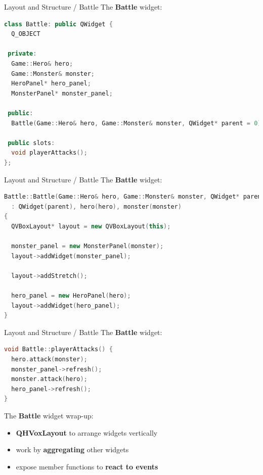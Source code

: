 \documentclass[11pt]{beamer}
\renewcommand{\emph}[1]{\textbf{#1}}
\begin{document}
\begin{frame}[fragile]{Layout and Structure / Battle}
 The \emph{Battle} widget:
 \begin{lstlisting}[language=C++]
class Battle: public QWidget {
  Q_OBJECT

 private:
  Game::Hero& hero;
  Game::Monster& monster;
  HeroPanel* hero_panel;
  MonsterPanel* monster_panel;

 public:
  Battle(Game::Hero& hero, Game::Monster& monster, QWidget* parent = 0);
  
 public slots:
  void playerAttacks();
};
\end{lstlisting}
\end{frame}

\begin{frame}[fragile]{Layout and Structure / Battle}
 The \emph{Battle} widget:
 \begin{lstlisting}[language=C++]
Battle::Battle(Game::Hero& hero, Game::Monster& monster, QWidget* parent)
  : QWidget(parent), hero(hero), monster(monster)
{
  QVBoxLayout* layout = new QVBoxLayout(this);

  monster_panel = new MonsterPanel(monster);
  layout->addWidget(monster_panel);

  layout->addStretch();

  hero_panel = new HeroPanel(hero);
  layout->addWidget(hero_panel);
}
\end{lstlisting}
\end{frame}

\begin{frame}[fragile]{Layout and Structure / Battle}
 The \emph{Battle} widget:
 \begin{lstlisting}[language=C++]
void Battle::playerAttacks() {
  hero.attack(monster);
  monster_panel->refresh();
  monster.attack(hero);
  hero_panel->refresh();
}
\end{lstlisting}

 The \emph{Battle} widget wrap-up:
 \begin{itemize}
  \item \emph{QHVoxLayout} to arrange widgets vertically
  \item work by \emph{aggregating} other widgets
  \item expose member functions to \emph{react to events}
 \end{itemize}
\end{frame}
\end{document}
